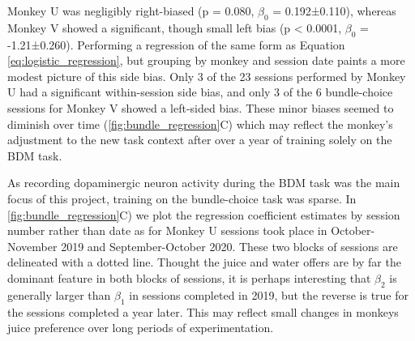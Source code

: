 Monkey U was negligibly right-biased (p = 0.080, $\beta_0$ = 0.192±0.110), whereas Monkey V showed a significant, though small left bias (p < 0.0001, $\beta_0$ = -1.21±0.260). Performing a regression of the same form as Equation \ref{eq:logistic_regression}, but grouping by monkey and session date paints a more modest picture of this side bias. Only 3 of the 23 sessions performed by Monkey U had a significant within-session side bias, and only 3 of the 6 bundle-choice sessions for Monkey V showed a left-sided bias. These minor biases seemed to diminish over time (\ref{fig:bundle_regression}C) which may reflect the monkey’s adjustment to the new task context after over a year of training solely on the BDM task.

As recording dopaminergic neuron activity during the BDM task was the main focus of this project, training on the bundle-choice task was sparse. In \ref{fig:bundle_regression}C) we plot the regression coefficient estimates by session number rather than date as for Monkey U sessions took place in October-November 2019 and September-October 2020. These two blocks of sessions are delineated with a dotted line. Thought the juice and water offers are by far the dominant feature in both blocks of sessions, it is perhaps interesting that $\beta_2$ is generally larger than $\beta_1$ in sessions completed in 2019, but the reverse is true for the sessions completed a year later. This may reflect small changes in monkeys juice preference over long periods of experimentation.

